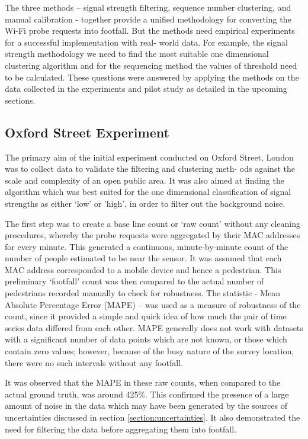 The three methods – signal strength filtering, sequence number clustering, and manual calibration - together provide a unified methodology for converting the Wi-Fi probe requests into footfall.
But the methods need empirical experiments for a successful implementation with real- world data.
For example, the signal strength methodology we need to find the most suitable one dimensional clustering algorithm and for the sequencing method the values of threshold need to be calculated.
These questions were answered by applying the methods on the data collected in the experiments and pilot study as detailed in the upcoming sections.

\subsection{Oxford Street Experiment}

The primary aim of the initial experiment conducted on Oxford Street, London was to collect data to validate the filtering and clustering meth- ods against the scale and complexity of an open public area.
It was also aimed at finding the algorithm which was best suited for the one dimensional classification of signal strengths as either ‘low’ or ’high’, in order to filter out the background noise.

The first step was to create a base line count or ‘raw count’ without any cleaning procedures, whereby the probe requests were aggregated by their MAC addresses for every minute.
This generated a continuous, minute-by-minute count of the number of people estimated to be near the sensor.
It was assumed that each MAC address corresponded to a mobile device and hence a pedestrian.
This preliminary ‘footfall’ count was then compared to the actual number of pedestrians recorded manually to check for robustness.
The statistic - Mean Absolute Percentage Error (MAPE) – was used as a measure of robustness of the count, since it provided a simple and quick idea of how much the pair of time series data differed from each other.
MAPE generally does not work with datasets with a significant number of data points which are not known, or those which contain zero values; however, because of the busy nature of the survey location, there were no such intervals without any footfall.

It was observed that the MAPE in these raw counts, when compared to the actual ground truth, was around 425\%.
This confirmed the presence of a large amount of noise in the data which may have been generated by the sources of uncertainties discussed in section \ref{section:uncertainties}.
It also demonstrated the need for filtering the data before aggregating them into footfall.

